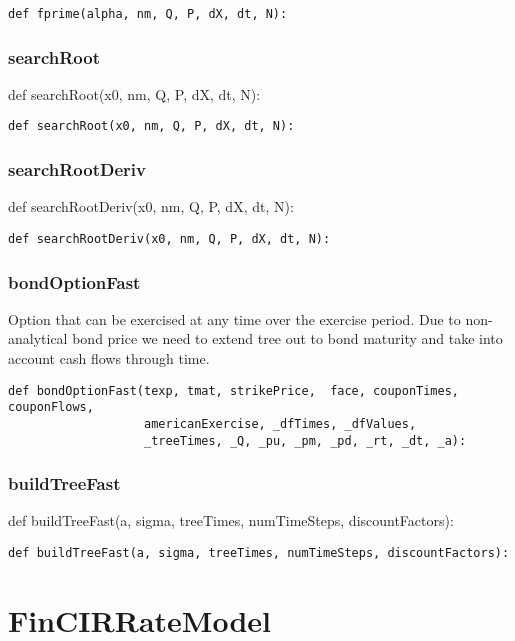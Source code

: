 \documentclass[twoside,11pt]{book}
\begin{document}
\begin{lstlisting}
def fprime(alpha, nm, Q, P, dX, dt, N):
\end{lstlisting}

\subsubsection*{{\bf searchRoot}}
def searchRoot(x0, nm, Q, P, dX, dt, N): 

\begin{lstlisting}
def searchRoot(x0, nm, Q, P, dX, dt, N):
\end{lstlisting}

\subsubsection*{{\bf searchRootDeriv}}
def searchRootDeriv(x0, nm, Q, P, dX, dt, N): 

\begin{lstlisting}
def searchRootDeriv(x0, nm, Q, P, dX, dt, N):
\end{lstlisting}

\subsubsection*{{\bf bondOptionFast}}
Option that can be exercised at any time over the exercise period. Due to non-analytical bond price we need to extend tree out to bond maturity and take into account cash flows through time.  

\begin{lstlisting}
def bondOptionFast(texp, tmat, strikePrice,  face, couponTimes, couponFlows,
                   americanExercise, _dfTimes, _dfValues,
                   _treeTimes, _Q, _pu, _pm, _pd, _rt, _dt, _a):
\end{lstlisting}

\subsubsection*{{\bf buildTreeFast}}
def buildTreeFast(a, sigma, treeTimes, numTimeSteps, discountFactors): 

\begin{lstlisting}
def buildTreeFast(a, sigma, treeTimes, numTimeSteps, discountFactors):
\end{lstlisting}

\newpage
\section{FinCIRRateModel}
\end{document}

